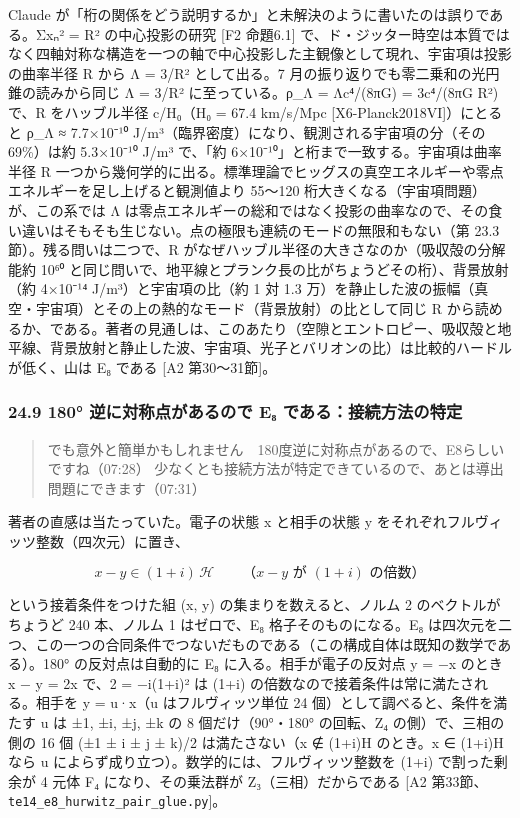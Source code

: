 \documentclass[
  a4paper,
]{ltjsarticle}
\begin{document}
Claude
が「桁の関係をどう説明するか」と未解決のように書いたのは誤りである。Σxₙ²
= R² の中心投影の研究 {[}F2 命題6.1{]}
で、ド・ジッター時空は本質ではなく四軸対称な構造を一つの軸で中心投影した主観像として現れ、宇宙項は投影の曲率半径
R から Λ = 3/R² として出る。7
月の振り返りでも零二乗和の光円錐の読みから同じ Λ = 3/R²
に至っている。ρ\_Λ = Λc⁴/(8πG) = 3c⁴/(8πG R²) で、R をハッブル半径
c/H₀（H₀ = 67.4 km/s/Mpc {[}X6-Planck2018VI{]}）にとると ρ\_Λ ≈
7.7×10⁻¹⁰ J/m³（臨界密度）になり、観測される宇宙項の分（その 69\%）は約
5.3×10⁻¹⁰ J/m³ で、「約 6×10⁻¹⁰」と桁まで一致する。宇宙項は曲率半径 R
一つから幾何学的に出る。標準理論でヒッグスの真空エネルギーや零点エネルギーを足し上げると観測値より
55〜120 桁大きくなる（宇宙項問題）が、この系では Λ
は零点エネルギーの総和ではなく投影の曲率なので、その食い違いはそもそも生じない。点の極限も連続のモードの無限和もない（第
23.3 節）。残る問いは二つで、R
がなぜハッブル半径の大きさなのか（吸収殻の分解能約 10⁶⁰
と同じ問いで、地平線とプランク長の比がちょうどその桁）、背景放射（約
4×10⁻¹⁴ J/m³）と宇宙項の比（約 1 対 1.3
万）を静止した波の振幅（真空・宇宙項）とその上の熱的なモード（背景放射）の比として同じ
R
から読めるか、である。著者の見通しは、このあたり（空隙とエントロピー、吸収殻と地平線、背景放射と静止した波、宇宙項、光子とバリオンの比）は比較的ハードルが低く、山は
E₈ である {[}A2 第30〜31節{]}。

\subsubsection{24.9 180° 逆に対称点があるので E₈
である：接続方法の特定}\label{ux9006ux306bux5bfeux79f0ux70b9ux304cux3042ux308bux306eux3067-eux2088-ux3067ux3042ux308bux63a5ux7d9aux65b9ux6cd5ux306eux7279ux5b9a}

\begin{quote}
でも意外と簡単かもしれません　180度逆に対称点があるので、E8らしいですね（07:28）
少なくとも接続方法が特定できているので、あとは導出問題にできます（07:31）
\end{quote}

著者の直感は当たっていた。電子の状態 x と相手の状態 y
をそれぞれフルヴィッツ整数（四次元）に置き、

\[
x-y\in(1+i)\,\mathcal H\qquad\text{（}x-y\text{ が }(1+i)\text{ の倍数）}
\]

という接着条件をつけた組 (x, y) の集まりを数えると、ノルム 2
のベクトルがちょうど 240 本、ノルム 1 はゼロで、E₈
格子そのものになる。E₈
は四次元を二つ、この一つの合同条件でつないだものである（この構成自体は既知の数学である）。180°
の反対点は自動的に E₈ に入る。相手が電子の反対点 y = −x のとき x − y =
2x で、2 = −i(1+i)² は (1+i)
の倍数なので接着条件は常に満たされる。相手を y = u·x（u
はフルヴィッツ単位 24 個）として調べると、条件を満たす u は ±1, ±i, ±j,
±k の 8 個だけ（90°・180° の回転、Z₄ の側）で、三相の側の 16 個 (±1 ± i
± j ± k)/2 は満たさない（x ∉ (1+i)H のとき。x ∈ (1+i)H なら u
によらず成り立つ）。数学的には、フルヴィッツ整数を (1+i) で割った剰余が
4 元体 F₄ になり、その乗法群が Z₃（三相）だからである {[}A2
第33節、\texttt{te14\_\allowbreak{}e8\_\allowbreak{}hurwitz\_\allowbreak{}pair\_\allowbreak{}glue.py}{]}。
\end{document}
